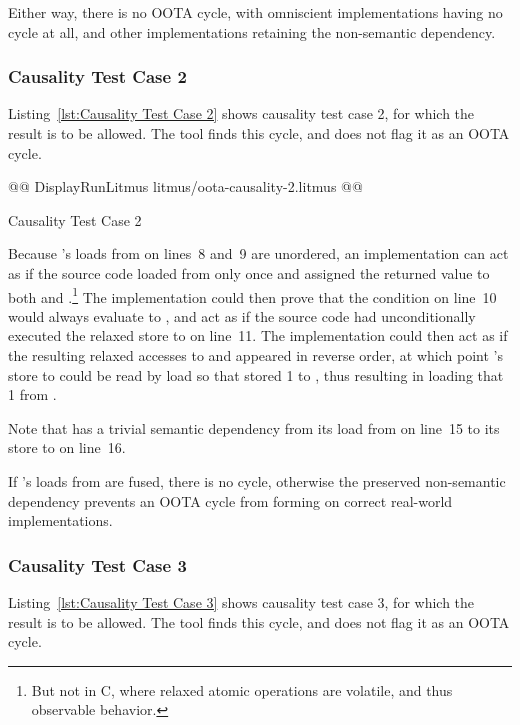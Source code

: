 \documentclass[10]{article}
\begin{document}
Either way, there is no OOTA cycle, with omniscient implementations
having no cycle at all, and other implementations retaining the
non-semantic dependency.

\subsubsection{Causality Test Case 2}
\label{app:Causality Test Case 2}

Listing~\ref{lst:Causality Test Case 2}
shows causality test case 2, for which the  result
is to be allowed.
The  tool finds this cycle, and does not flag it as an OOTA cycle.

\begin{listing}[tbp]
@@ DisplayRunLitmus litmus/oota-causality-2.litmus @@
\caption{Causality Test Case 2}
\label{lst:Causality Test Case 2}
\end{listing}

Because 's loads from  on lines~8 and~9 are unordered,
an implementation can act as if the source code loaded from  only
once and assigned the returned value to both  and .\footnote{
	But not in C, where relaxed atomic operations are volatile,
	and thus observable behavior.}
The implementation could then prove that the condition on line~10
would always evaluate to , and act as if the source code had
unconditionally executed the relaxed store to  on line~11.
The implementation could then act as if the resulting relaxed accesses
to  and  appeared in reverse order, at which point
's store to  could be read by  load so that
 stored 1 to , thus resulting in  loading
that 1 from .

Note that  has a trivial semantic dependency from its load
from  on line~15 to its store to  on line~16.

If 's loads from  are fused, there is no cycle,
otherwise the preserved non-semantic dependency prevents an
OOTA cycle from forming on correct real-world implementations.

\subsubsection{Causality Test Case 3}
\label{app:Causality Test Case 3}

Listing~\ref{lst:Causality Test Case 3}
shows causality test case 3, for which the  result
is to be allowed.
The  tool finds this cycle, and does not flag it as an OOTA cycle.
\end{document}
